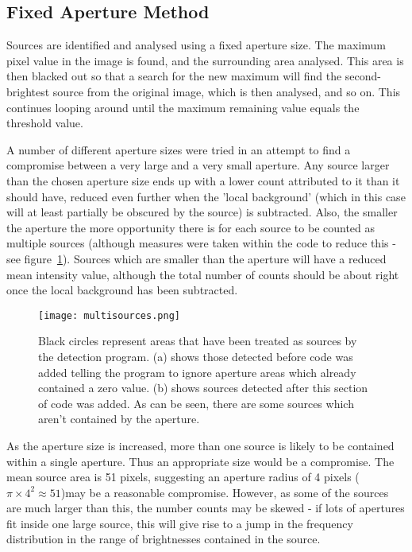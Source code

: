 \documentclass[a4paper,11pt,twoside]{article}
\begin{document}
\subsection{Fixed Aperture Method}

Sources are identified and analysed using a fixed aperture size. 
The maximum pixel value in the image is found, and the surrounding 
area analysed. This area is then blacked out so that a search for 
the new maximum will find the second-brightest source from the 
original image, which is then analysed, and so on. This continues 
looping around until the maximum remaining value equals the threshold value.

A number of different aperture sizes were tried in an attempt to 
find a compromise between a very large and a very small 
aperture. Any source larger than the chosen aperture size ends up 
with a lower count attributed to it than it should have, reduced 
even further when the 'local background' (which in this case will 
at least partially be obscured by the source) is subtracted. Also, 
the smaller the aperture the more opportunity there is for each source 
to be counted as multiple sources (although measures were taken within 
the code to reduce this - see figure~\ref{fig:multisources}). 
Sources which are smaller than the aperture will have a 
reduced mean intensity value, although the total number of counts 
should be about right once the local background has been subtracted. 

\begin{figure}[htb]
  \centering
  \texttt{[image: multisources.png]}
  \caption{Black circles represent areas that have been treated as 
sources by the detection program. (a) shows those detected before 
code was added telling the program to ignore aperture areas which 
already contained a zero value. (b) shows sources detected 
after this section of code was added. As can be seen, there are some 
sources which aren't contained by the aperture.}
  \label{fig:multisources}
\end{figure}

As the aperture size is increased, more than one source is likely 
to be contained within a single aperture. Thus an appropriate size 
would be a compromise. The mean source area is 51 pixels, suggesting 
an aperture radius of 4 pixels (\(\pi \times 4^2 \approx 51\))may be a 
reasonable compromise. However, as some of the sources are much larger 
than this, the number counts may be skewed - if lots of apertures 
fit inside one large source, this will give rise to a jump in the 
frequency distribution in the range of brightnesses contained in the 
source.
\end{document}
